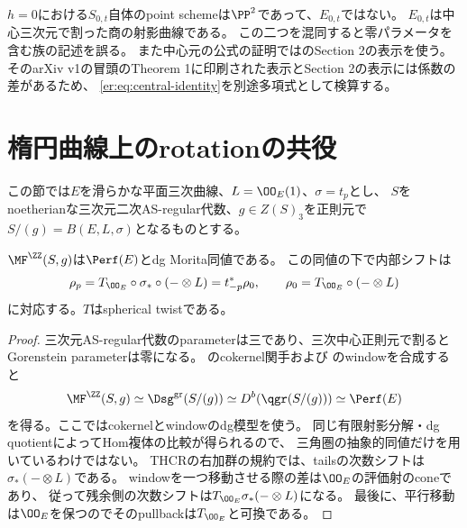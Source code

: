 \begin{remark}
$h=0$における$S_{0,t}$自体のpoint schemeは$\PP^2$であって、$E_{0,t}$ではない。
$E_{0,t}$は中心三次元で割った商の射影曲線である。
この二つを混同すると零パラメータを含む族の記述を誤る。
また中心元の公式の証明では\cite{DeLaetLeBruyn}のSection 2の表示を使う。
そのarXiv v1の冒頭のTheorem 1に印刷された表示とSection 2の表示には係数の差があるため、
\eqref{er:eq:central-identity}を別途多項式として検算する。
\end{remark}

\section{楕円曲線上のrotationの共役}\label{er:sec:rotation}
この節では$E$を滑らかな平面三次曲線、$L=\OO_E(1)$、$\sigma=t_p$とし、
$S$をnoetherianな三次元二次AS-regular代数、$g\in Z(S)_3$を正則元で
$S/(g)=B(E,L,\sigma)$となるものとする。

\begin{lemma}\label{er:lem:block}
$\MF^\ZZ(S,g)$は$\Perf(E)$とdg Morita同値である。
この同値の下で内部シフトは
\[
 \rho_p=T_{\OO_E}\circ\sigma_*\circ(-\otimes L)
       =t_{-p}^*\rho_0,
 \qquad \rho_0=T_{\OO_E}\circ(-\otimes L)
\]
に対応する。$T$はspherical twistである。
\end{lemma}
\begin{proof}
三次元AS-regular代数のparameterは三であり、三次中心正則元で割ると
Gorenstein parameterは零になる。
\cite[Theorem 5.8]{CCKM}のcokernel関手および
\cite[Theorem 2.5(iii)]{Orlov}のwindowを合成すると
\[
 \MF^\ZZ(S,g)\simeq \Dsg^{\mathrm{gr}}(S/(g))
 \simeq D^b(\qgr(S/(g)))\simeq\Perf(E)
\]
を得る。ここではcokernelとwindowのdg模型を使う。
同じ有限射影分解・dg quotientによってHom複体の比較が得られるので、
三角圏の抽象的同値だけを用いているわけではない。
THCRの右加群の規約では、tailsの次数シフトは
$\sigma_*(-\otimes L)$である。
windowを一つ移動させる際の差は$\OO_E$の評価射のconeであり、
従って残余側の次数シフトは$T_{\OO_E}\sigma_*(-\otimes L)$になる。
最後に、平行移動は$\OO_E$を保つのでそのpullbackは$T_{\OO_E}$と可換である。
\end{proof}

